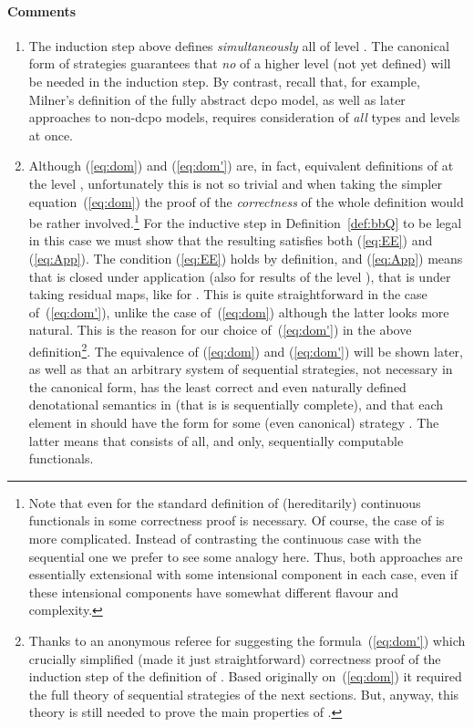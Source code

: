 \documentclass[fleqn]{LMCS}
\theoremstyle{plain}\newtheorem{satz}[thm]{Satz}
\theoremstyle{plain}\newtheorem{hyp}[thm]{Hypothesis}
\theoremstyle{plain}\newtheorem{hyps}[thm]{Hypotheses}
\theoremstyle{definition}\newtheorem{note}[thm]{Note}
\newcommand{\?}{\mbox{?}}
\begin{document}
\paragraph*{\bf Comments} 
\begin{enumerate}[(1)]
\item
The induction step above defines
{\em simultaneously\/} all  of level .
The canonical form of
strategies guarantees that {\em no\/}  of a higher level
(not yet defined)
will be needed in the induction step.
By contrast, recall that, for example, Milner's definition of the fully abstract dcpo model, 
as well as later approaches to non-dcpo models, 
requires consideration of \emph{all} types and levels at once.



\item
Although (\ref{eq:dom}) and (\ref{eq:dom'}) are, in fact, equivalent definitions 
of  at the level \mbox{}, unfortunately this is not so trivial and 
when taking the simpler equation~(\ref{eq:dom}) 
the proof of the \emph{correctness} of the whole definition would be rather involved.\footnote{Note that even for the standard definition of (hereditarily)
continuous functionals in  some correctness proof
is necessary.  Of course, the case of  is more
complicated. Instead of contrasting the continuous case with the
sequential one we prefer to see some analogy here. Thus, both
approaches are essentially extensional with some intensional component in each
case, even if these intensional components have somewhat different
flavour and complexity.  } For the inductive step in
Definition~\ref{def:bbQ} to be legal in this case we must show that
the resulting  satisfies both (\ref{eq:EE}) and
(\ref{eq:App}).  The condition (\ref{eq:EE}) holds by definition, and
(\ref{eq:App}) means that  is closed under
application (also for results of the level ), that is under
taking residual maps, like for .  This is
quite straightforward in the case of~(\ref{eq:dom'}), unlike the case
of~(\ref{eq:dom}) although the latter looks more natural.  This is the
reason for our choice of~(\ref{eq:dom'}) in the above definition\footnote{Thanks to an anonymous referee for suggesting the formula~(\ref{eq:dom'}) 
which crucially simplified (made it just straightforward) 
correctness proof of the induction step 
of the definition of . Based originally on~(\ref{eq:dom}) it required 
the full theory of sequential strategies of the next sections. 
But, anyway, this theory is still needed to prove the main 
properties of . 
}.
The equivalence of (\ref{eq:dom}) and (\ref{eq:dom'}) 
will be shown later, 
as well as that 
an arbitrary system of sequential strategies, not necessary in the canonical form, 
has the least correct and even naturally defined denotational semantics  in  
(that is  is sequentially complete), 
and that each element in 
 should have the form  for some (even canonical) strategy
. The latter means that  consists of all, and only, sequentially 
computable functionals. 


\end{enumerate}
\end{document}
